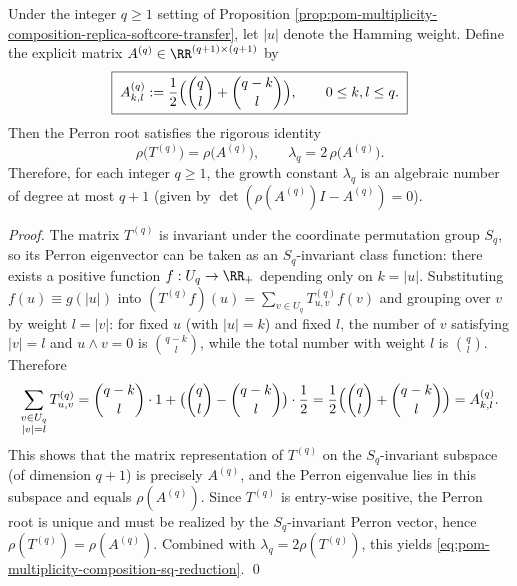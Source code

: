 \begin{proposition}\label{prop:pom-multiplicity-composition-sq-symmetry-reduction}
Under the integer \(q\ge 1\) setting of Proposition \ref{prop:pom-multiplicity-composition-replica-softcore-transfer},
let \(|u|\) denote the Hamming weight.
Define the explicit matrix \(A^{(q)}\in\RR^{(q+1)\times(q+1)}\) by
\begin{equation}\label{eq:pom-multiplicity-composition-Aq-def}
\boxed{\;
A^{(q)}_{k,l}:=\frac12\Bigl(\binom{q}{l}+\binom{q-k}{l}\Bigr),
\qquad 0\le k,l\le q.\;}
\end{equation}
Then the Perron root satisfies the rigorous identity
\begin{equation}\label{eq:pom-multiplicity-composition-sq-reduction}
\boxed{\;
\rho\!\bigl(T^{(q)}\bigr)=\rho\!\bigl(A^{(q)}\bigr),\qquad
\lambda_q=2\,\rho\!\bigl(A^{(q)}\bigr).\;}
\end{equation}
Therefore, for each integer \(q\ge 1\), the growth constant \(\lambda_q\) is an algebraic number of degree at most \(q+1\) (given by \(\det(\rho(A^{(q)})I-A^{(q)})=0\)).
\end{proposition}
\begin{proof}
The matrix \(T^{(q)}\) is invariant under the coordinate permutation group \(S_q\), so its Perron eigenvector can be taken as an \(S_q\)-invariant class function:
there exists a positive function \(f:U_q\to\RR_+\) depending only on \(k=|u|\).
Substituting \(f(u)\equiv g(|u|)\) into \((T^{(q)}f)(u)=\sum_{v\in U_q}T^{(q)}_{u,v}f(v)\) and grouping over \(v\) by weight \(l=|v|\):
for fixed \(u\) (with \(|u|=k\)) and fixed \(l\), the number of \(v\) satisfying \(|v|=l\) and \(u\wedge v=0\) is \(\binom{q-k}{l}\), while the total number with weight \(l\) is \(\binom{q}{l}\).
Therefore
\[
\sum_{\substack{v\in U_q\\ |v|=l}}T^{(q)}_{u,v}
=\binom{q-k}{l}\cdot 1 + \bigl(\binom{q}{l}-\binom{q-k}{l}\bigr)\cdot \frac12
=\frac12\Bigl(\binom{q}{l}+\binom{q-k}{l}\Bigr)
=A^{(q)}_{k,l}.
\]
This shows that the matrix representation of \(T^{(q)}\) on the \(S_q\)-invariant subspace (of dimension \(q+1\)) is precisely \(A^{(q)}\), and the Perron eigenvalue lies in this subspace and equals \(\rho(A^{(q)})\).
Since \(T^{(q)}\) is entry-wise positive, the Perron root is unique and must be realized by the \(S_q\)-invariant Perron vector, hence \(\rho(T^{(q)})=\rho(A^{(q)})\).
Combined with \(\lambda_q=2\rho(T^{(q)})\), this yields \eqref{eq:pom-multiplicity-composition-sq-reduction}. \qed
\end{proof}

